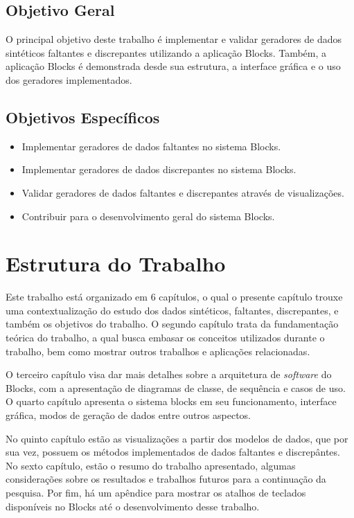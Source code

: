 \documentclass[
	12pt,				%
	openright,			%
	oneside,			%
	a4paper,			%
	english,			%
	brazil				%
	]{abntex2}
\begin{document}
		\subsection{Objetivo Geral}
			O principal objetivo deste trabalho é implementar e validar geradores de dados sintéticos faltantes e discrepantes utilizando a aplicação Blocks.
			Também, a aplicação Blocks é demonstrada desde sua estrutura, a interface gráfica e o uso dos geradores implementados.			
		\subsection{Objetivos Específicos}
		\begin{itemize}
			\item Implementar geradores de dados faltantes no sistema Blocks.
			\item Implementar geradores de dados discrepantes no sistema Blocks.
			\item Validar geradores de dados faltantes e discrepantes através de visualizações.
			\item Contribuir para o desenvolvimento geral do sistema Blocks.
		\end{itemize}
	\section{Estrutura do Trabalho}
		Este trabalho está organizado em 6 capítulos, o qual o presente capítulo trouxe uma contextualização do estudo dos dados sintéticos, faltantes, discrepantes, e também os objetivos do trabalho.
		O segundo capítulo trata da fundamentação teórica do trabalho, a qual busca embasar os conceitos utilizados durante o trabalho, bem como mostrar outros trabalhos e aplicações relacionadas.
		\par
		O terceiro capítulo visa dar mais detalhes sobre a arquitetura de \emph{software} do Blocks, com a apresentação de diagramas de classe, de sequência e casos de uso.
		O quarto capítulo apresenta o sistema blocks em seu funcionamento, interface gráfica, modos de geração de dados entre outros aspectos.
		\par
		No quinto capítulo estão as visualizações a partir dos modelos de dados, que por sua vez, possuem os métodos implementados de dados faltantes e discrepântes.
		No sexto capítulo, estão o resumo do trabalho apresentado, algumas considerações sobre os resultados e trabalhos futuros para a continuação da pesquisa. 
		Por fim, há um apêndice para mostrar os atalhos de teclados disponíveis no Blocks até o desenvolvimento desse trabalho.
\end{document}
